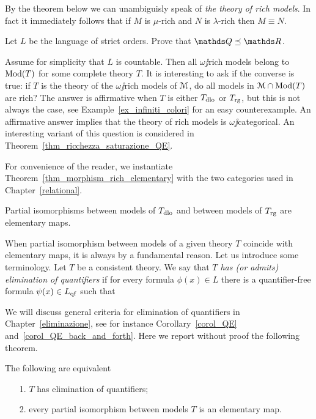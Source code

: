 \documentclass[creche.tex]{subfiles}
\begin{document}
By the theorem below  we can unambiguisly speak of \emph{the theory of rich models}. In fact it immediately follows that if $M$ is $\mu$-rich and $N$ is $\lambda$-rich then $M\equiv N$.

\begin{exercise}
Let $L$ be the language of strict orders. Prove that $\QQ\preceq\RR$.\QED
\end{exercise}

Assume for simplicity that $L$ is countable. Then all $\omega\jj$rich models belong to $\mathop{\rm Mod}(T)$ for some complete theory $T$. It is interesting to ask if the converse is true: if $T$ is the theory of the $\omega\jj$rich models of $\EuScript M$, do all models in $\EuScript M\cap \mathop{\rm Mod}(T)$ are rich?  The answer is affirmative when $T$ is either $T_{\rm dlo}$ or $T_{\rm rg}$, but this is not always the case, see Example~\ref{ex_infiniti_colori} for an easy counterexample. An affirmative answer implies that the theory of rich models is $\omega\jj$categorical. An interesting variant of this question is considered in Theorem~\ref{thm_ricchezza_saturazione_QE}.

For convenience of the reader, we instantiate Theorem~\ref{thm_morphism_rich_elementary} with the two categories used in Chapter~\ref{relational}.

\begin{corollary}\label{coroll_tutteleimmersionisonoelementari=eliminazioneqantificatori}
Partial isomorphisms between models of $T_{\rm dlo}$ and between models of $T_{\rm rg}$ are elementary maps.\QED
\end{corollary}

When partial isomorphism between models of a given theory $T$ coincide with elementary maps, it is always by a fundamental reason. Let us introduce some terminology. Let $T$ be a consistent theory. We say that \emph{$T$ has (or admits) elimination of quantifiers\/} if for every formula $\phi(x)\in L$ there is a quantifier-free formula $\psi(x)\in L_{\rm qf}$ such that 


We will discuss general criteria for elimination of quantifiers in Chapter~\ref{eliminazione}, see for instance Corollary~\ref{corol_QE} and~\ref{corol_QE_back_and_forth}. Here we report without proof the following theorem.

\begin{theorem}\label{thm_tutteleimmersionisonoelementari=eliminazioneqantificatori}
The following are equivalent
\begin{itemize}
\item[1.] $T$ has elimination of quantifiers;
\item[2.] every partial isomorphism between models $T$ is an elementary map.\QED
\end{itemize}
\end{theorem}
\end{document}
